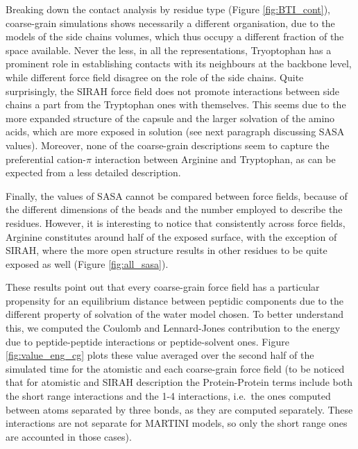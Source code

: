 Breaking down the contact analysis by residue type (Figure \ref{fig:BTI_cont}), coarse-grain simulations shows necessarily a different organisation, due to the models of the side chains volumes, which thus occupy a different fraction of the space available.
%
Never the less, in all the representations, Tryoptophan has a prominent role in establishing contacts with its neighbours at the backbone level, while different force field disagree on the role of the side chains. Quite surprisingly, the SIRAH force field does not promote interactions between side chains a part from the Tryptophan ones with themselves. This seems due to the more expanded structure of the capsule and the larger solvation of the amino acids, which are more exposed in solution (see next paragraph discussing SASA values).
%
Moreover, none of the coarse-grain descriptions seem to capture the preferential cation-$\pi$ interaction between Arginine and Tryptophan, as can be expected from a less detailed description.

Finally, the values of SASA cannot be compared between force fields, because of the different dimensions of the beads and the number employed to describe the residues. However, it is interesting to notice that consistently across force fields, Arginine constitutes around half of the exposed surface, with the exception of SIRAH, where the more open structure results in other residues to be quite exposed as well (Figure \ref{fig:all_sasa}).

These results point out that every coarse-grain force field has a particular propensity for an equilibrium distance between peptidic components due to the different property of solvation of the water model chosen. To better understand this, we computed the Coulomb and Lennard-Jones contribution to the energy due to peptide-peptide interactions or peptide-solvent ones.
%
Figure \ref{fig:value_eng_cg} plots these value averaged over the second half of the simulated time for the atomistic and each coarse-grain force field (to be noticed that for atomistic and SIRAH description the Protein-Protein terms include both the short range interactions and the 1-4 interactions, i.e.\ the ones computed between atoms separated by three bonds, as they are computed separately. These interactions are not separate for MARTINI models, so only the short range ones are accounted in those cases).

